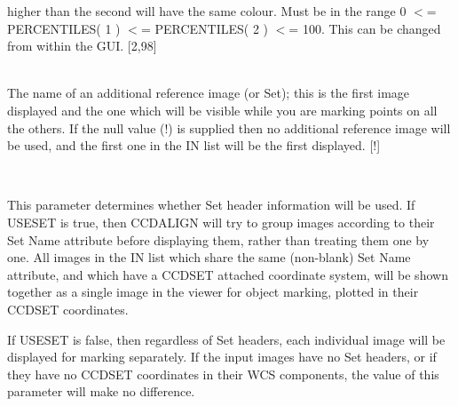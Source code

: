 \documentclass[twoside,11pt]{article}
\renewcommand{\_}{\texttt{\symbol{95}}}
\newcommand{\routine}[1]{{\sc #1}}
\newcommand{\sstsubsection}[1]{ \item[{#1}] \mbox{} \\}
\newcommand{\sstsubsection}[1]{\item[{#1}]}
\begin{document}
{{{         higher than the second will have the same colour.  Must be in
         the range 0 $<$= PERCENTILES( 1 ) $<$= PERCENTILES( 2 ) $<$= 100.
         This can be changed from within the GUI.
         [2,98]
      }
      \sstsubsection{
         REFNDF = LITERAL (Read)
      }{
         The name of an additional reference image (or Set); this is the
         first image displayed and the one which will be visible while
         you are marking points on all the others.  If the null value
         (!) is supplied then no additional reference image will be
         used, and the first one in the IN list will be the first
         displayed.
         [!]
      }
      \sstsubsection{
         USESET = \_LOGICAL (Read)
      }{
         This parameter determines whether Set header information will
         be used.  If USESET is true, then \routine{CCDALIGN} will try to
         group images according to their Set Name attribute before
         displaying them, rather than treating them one by one.
         All images in the IN list which share the same (non-blank)
         Set Name attribute, and which have a CCD\_SET attached
         coordinate system, will be shown together as a single
         image in the viewer for object marking, plotted in their
         CCD\_SET coordinates.

         If USESET is false, then regardless of Set headers, each
         individual image will be displayed for marking separately.
         If the input images have no Set headers, or if they have
         no CCD\_SET coordinates in their WCS components, the value
         of this parameter will make no difference.

}}}
\end{document}
